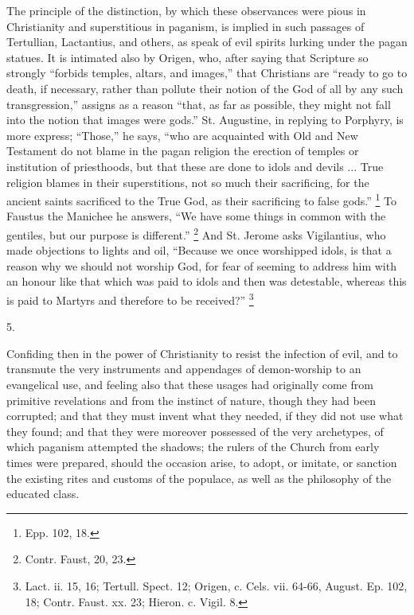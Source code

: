 The principle of the distinction, by which these
observances were pious in Christianity and superstitious
in paganism, is implied in such passages of Tertullian,
Lactantius, and others, as speak of evil spirits lurking
under the pagan statues. It is intimated also by Origen,
who, after saying that Scripture so strongly
``forbids temples, altars, and images,'' that
Christians are ``ready to go to death, if necessary,
rather than pollute their notion of the God of all by any
such transgression,'' assigns as a reason ``that,
as far as possible, they might not fall into the notion
that images were gods.'' St. Augustine, in replying
to Porphyry, is more express; ``Those,'' he says,
``who are acquainted with Old and New Testament do
not blame in the pagan religion the erection of temples
or institution of priesthoods, but that these are done to
idols and devils ... True religion blames in their
superstitions, not so much their sacrificing, for the
ancient saints sacrificed to the True God, as their
sacrificing to false gods.'' \footnote{Epp. 102, 18.} To Faustus the Manichee he
answers, ``We have some things in common with the
gentiles, but our purpose is different.'' \footnote{Contr. Faust, 20, 23.} And St.
Jerome asks Vigilantius, who made objections to lights
and oil, ``Because we once worshipped idols, is that
a reason why we should not worship God, for fear of
seeming to address him with an honour like that which was
paid to idols and then was detestable, whereas this is
paid to Martyrs and therefore to be received?'' \footnote{Lact. ii. 15, 16; Tertull.
Spect. 12; Origen, c. Cels. vii. 64-66, August. Ep. 102,
18; Contr. Faust. xx. 23; Hieron. c. Vigil. 8.}

5.

Confiding then in the power of Christianity to resist
the infection of evil, and to transmute the very
instruments and appendages of demon-worship to an
evangelical use, and feeling also that these usages had
originally come from primitive revelations and from the
instinct of nature, though they had been corrupted; and
that they must invent what they needed, if they did not
use what they found; and that they were moreover
possessed of the very archetypes, of which paganism
attempted the shadows; the rulers of the Church from
early times were prepared, should the occasion arise, to
adopt, or imitate, or sanction the existing rites and
customs of the populace, as well as the philosophy of the
educated class.

